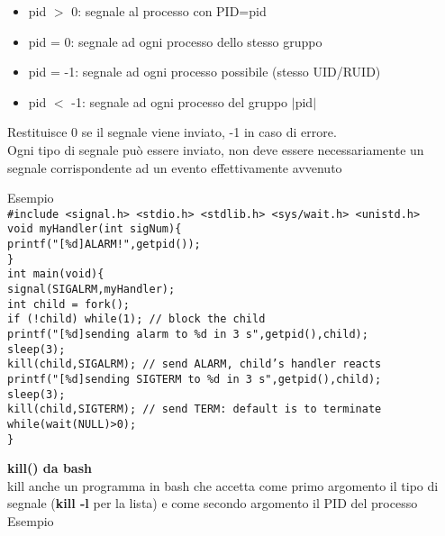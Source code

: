 \begin{flushleft}
\begin{flushleft}
    \begin{itemize}
      \item pid $>$ 0: segnale al processo con PID=pid
      \item pid = 0: segnale ad ogni processo dello stesso gruppo
      \item pid = -1: segnale ad ogni processo possibile (stesso UID/RUID)
      \item pid $<$ -1: segnale ad ogni processo del gruppo $|$pid$|$
    \end{itemize}
    Restituisce 0 se il segnale viene inviato, -1 in caso di errore.\\
    Ogni tipo di segnale può essere inviato, non deve essere necessariamente un segnale 
    corrispondente ad un evento effettivamente avvenuto \par 
    Esempio \\
    \texttt{\#include <signal.h> <stdio.h> <stdlib.h> <sys/wait.h> <unistd.h> \\
    void myHandler(int sigNum)\{\\
      \halftab printf("[\%d]ALARM!\n",getpid());\\ \}\\
    int main(void)\{ \\
    \halftab signal(SIGALRM,myHandler);\\
    \halftab int child = fork();\\
    \halftab if (!child) while(1); // block the child\\
    \halftab printf("[\%d]sending alarm to \%d in 3 s\n",getpid(),child);\\
    \halftab sleep(3);\\
    \halftab kill(child,SIGALRM); // send ALARM, child's handler reacts\\
    \halftab printf("[\%d]sending SIGTERM to \%d in 3 s\n",getpid(),child);\\
    \halftab sleep(3);\\
    \halftab kill(child,SIGTERM); // send TERM: default is to terminate\\
    \halftab while(wait(NULL)>0);\\
    \}}\par 
    \textbf{kill() da bash}\\
    kill \ace anche un programma in bash che accetta come primo argomento il tipo di 
    segnale (\textbf{kill -l} per la lista) e come secondo argomento il PID del processo\\
    Esempio\\

\end{flushleft}
\end{flushleft}
